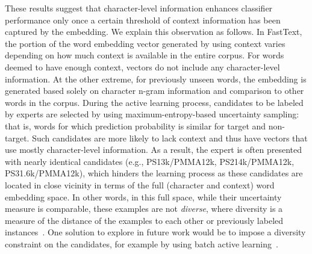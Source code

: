 These results suggest that character-level information enhances classifier performance only once a certain threshold of context information has been captured by the embedding.
We explain this observation as follows. 
In FastText, the portion of the word embedding vector generated by using context varies depending on how much context is available in the entire corpus. 
For words deemed to have enough context, vectors do not include any character-level information. 
At the other extreme, for previously unseen words, the embedding is generated based solely on character n-gram information and comparison to other words in the corpus.
During the active learning process, candidates to be labeled by experts are selected by using maximum-entropy-based uncertainty sampling: that is, words for which prediction probability is similar for target and non-target.
Such candidates are more likely to lack context
and thus have vectors that use mostly character-level information.
As a result, the expert is often presented with nearly identical candidates (e.g., PS13k/PMMA12k, PS214k/PMMA12k, PS31.6k/PMMA12k), which hinders the learning process as these candidates are located in close vicinity in terms of the full (character and context) word embedding space.
In other words, in this full space, while their uncertainty measure is comparable, these examples are not \textit{diverse}, where diversity is a measure of the distance of the examples to each other or previously labeled instances~\cite{brinker2003incorporating}.
One solution to explore in future work would be to impose a diversity constraint on the candidates,
for example by using batch active learning~\cite{settles2009active}.


